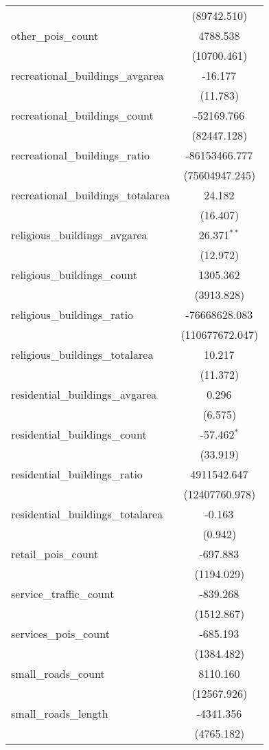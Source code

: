 \begin{table}[!htbp]
\begin{tabular}{@{\extracolsep{5pt}}lc}
  & (89742.510) \\
 other_pois_count & 4788.538$^{}$ \\
  & (10700.461) \\
 recreational_buildings_avgarea & -16.177$^{}$ \\
  & (11.783) \\
 recreational_buildings_count & -52169.766$^{}$ \\
  & (82447.128) \\
 recreational_buildings_ratio & -86153466.777$^{}$ \\
  & (75604947.245) \\
 recreational_buildings_totalarea & 24.182$^{}$ \\
  & (16.407) \\
 religious_buildings_avgarea & 26.371$^{**}$ \\
  & (12.972) \\
 religious_buildings_count & 1305.362$^{}$ \\
  & (3913.828) \\
 religious_buildings_ratio & -76668628.083$^{}$ \\
  & (110677672.047) \\
 religious_buildings_totalarea & 10.217$^{}$ \\
  & (11.372) \\
 residential_buildings_avgarea & 0.296$^{}$ \\
  & (6.575) \\
 residential_buildings_count & -57.462$^{*}$ \\
  & (33.919) \\
 residential_buildings_ratio & 4911542.647$^{}$ \\
  & (12407760.978) \\
 residential_buildings_totalarea & -0.163$^{}$ \\
  & (0.942) \\
 retail_pois_count & -697.883$^{}$ \\
  & (1194.029) \\
 service_traffic_count & -839.268$^{}$ \\
  & (1512.867) \\
 services_pois_count & -685.193$^{}$ \\
  & (1384.482) \\
 small_roads_count & 8110.160$^{}$ \\
  & (12567.926) \\
 small_roads_length & -4341.356$^{}$ \\
  & (4765.182) \\

\end{tabular}
\end{table}
